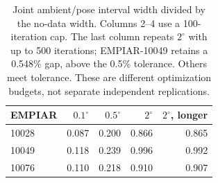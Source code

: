 \begin{table}[t]
\centering
\caption{Joint ambient/pose interval width divided by the no-data width. Columns 2--4 use a 100-iteration cap. The last column repeats $2^\circ$ with up to 500 iterations; EMPIAR-10049 retains a 0.548\% gap, above the 0.5\% tolerance. Others meet tolerance. These are different optimization budgets, not separate independent replications.}
\label{tab:ambientpose}
\begin{tabular}{lrrrr}
\toprule
EMPIAR & $0.1^\circ$ & $0.5^\circ$ & $2^\circ$ & $2^\circ$, longer \\
\midrule
10028 & 0.087 & 0.200 & 0.866 & 0.865 \\
10049 & 0.118 & 0.239 & 0.996 & 0.992 \\
10076 & 0.110 & 0.218 & 0.910 & 0.907 \\
\bottomrule
\end{tabular}
\end{table}
